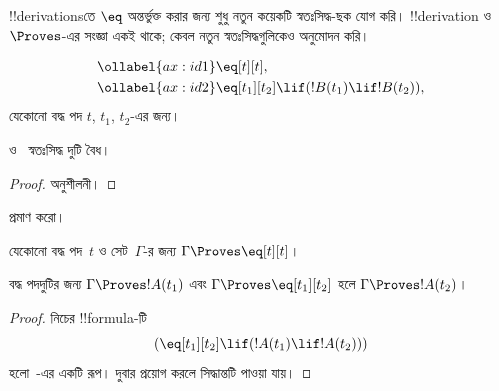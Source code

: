 \documentclass[../../../include/open-logic-section]{subfiles}
\begin{document}


!!{derivation}sতে $\eq$ অন্তর্ভুক্ত করার জন্য শুধু নতুন কয়েকটি
স্বতঃসিদ্ধ-ছক যোগ করি। !!{derivation} ও~$\Proves$-এর সংজ্ঞা একই
থাকে; কেবল নতুন স্বতঃসিদ্ধগুলিকেও অনুমোদন করি।

\begin{defn}[!!{identity}-র স্বতঃসিদ্ধ]
\begin{align}
\ollabel{ax:id1} & \eq[t][t], \\
\ollabel{ax:id2} & \eq[t_1][t_2] \lif (!B(t_1) \lif
  !B(t_2)),
\end{align}
যেকোনো বদ্ধ পদ $t$, $t_1$, $t_2$-এর জন্য।
\end{defn}

\begin{prop}
   ও~ স্বতঃসিদ্ধ দুটি বৈধ।
\end{prop}

\begin{proof}
  অনুশীলনী।
\end{proof}

\begin{prob}
 প্রমাণ করো।
\end{prob}

\begin{prop}
 যেকোনো বদ্ধ পদ~$t$ ও সেট~$\Gamma$-র জন্য $\Gamma \Proves \eq[t][t]$।
\end{prop}

\begin{prop}
  বদ্ধ পদদুটির জন্য $\Gamma \Proves !A(t_1)$ এবং $\Gamma
  \Proves \eq[t_1][t_2]$ হলে $\Gamma \Proves !A(t_2)$।
\end{prop}

\begin{proof}
নিচের !!{formula}-টি
\[
(\eq[t_1][t_2] \lif (!A(t_1) \lif !A(t_2)))
\]
হলো~-এর একটি রূপ। \MP দুবার প্রয়োগ করলে সিদ্ধান্তটি
পাওয়া যায়।
\end{proof}
\end{document}
